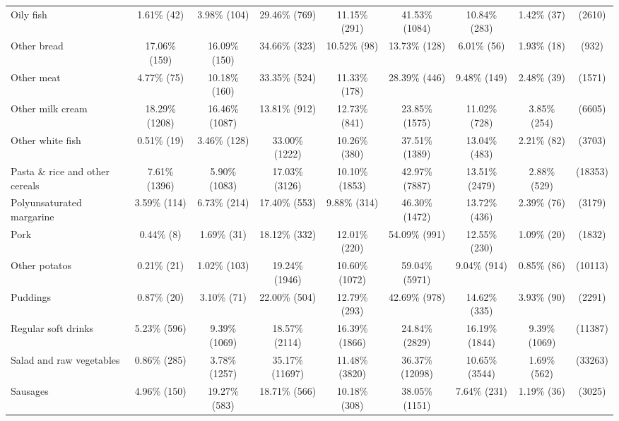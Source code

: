 \documentclass[utf8]{frontiers_suppmat} %
\begin{document}
\begin{table}[]
{\begin{tabular}{@{}lcccccccc@{}}
Oily fish                 & 1.61\%     (42)  & 3.98\%    (104)  & 29.46\%    (769) & 11.15\%   (291) & 41.53\%   (1084) & 10.84\%   (283) & 1.42\%    (37)  &    (2610) \\
Other bread               & 17.06\%    (159) & 16.09\%    (150) & 34.66\%    (323) & 10.52\%    (98) & 13.73\%    (128) & 6.01\%    (56)  & 1.93\%    (18)  &     (932) \\
Other meat                & 4.77\%     (75)  & 10.18\%    (160) & 33.35\%    (524) & 11.33\%   (178) & 28.39\%    (446) & 9.48\%   (149)  & 2.48\%    (39)  &    (1571) \\
Other milk cream          & 18.29\%   (1208) & 16.46\%   (1087) & 13.81\%    (912) & 12.73\%   (841) & 23.85\%   (1575) & 11.02\%   (728) & 3.85\%   (254)  &    (6605) \\
Other white fish          & 0.51\%     (19)  & 3.46\%    (128)  & 33.00\%   (1222) & 10.26\%   (380) & 37.51\%   (1389) & 13.04\%   (483) & 2.21\%    (82)  &    (3703) \\
Pasta \& rice and other cereals & 7.61\%   (1396)  & 5.90\%   (1083)  & 17.03\%   (3126) & 10.10\%  (1853) & 42.97\%   (7887) & 13.51\%  (2479) & 2.88\%   (529)  &   (18353) \\
Polyunsaturated margarine & 3.59\%    (114)  & 6.73\%    (214)  & 17.40\%    (553) & 9.88\%   (314)  & 46.30\%   (1472) & 13.72\%   (436) & 2.39\%    (76)  &    (3179) \\
Pork                      & 0.44\%      (8)  & 1.69\%     (31)  & 18.12\%    (332) & 12.01\%   (220) & 54.09\%    (991) & 12.55\%   (230) & 1.09\%    (20)  &    (1832) \\
Other potatos             & 0.21\%     (21)  & 1.02\%    (103)  & 19.24\%   (1946) & 10.60\%  (1072) & 59.04\%   (5971) & 9.04\%   (914)  & 0.85\%    (86)  &   (10113) \\
Puddings                  & 0.87\%     (20)  & 3.10\%     (71)  & 22.00\%    (504) & 12.79\%   (293) & 42.69\%    (978) & 14.62\%   (335) & 3.93\%    (90)  &    (2291) \\
Regular soft drinks       & 5.23\%    (596)  & 9.39\%   (1069)  & 18.57\%   (2114) & 16.39\%  (1866) & 24.84\%   (2829) & 16.19\%  (1844) & 9.39\%  (1069)  &   (11387) \\
Salad and raw vegetables  & 0.86\%    (285)  & 3.78\%   (1257)  & 35.17\%  (11697) & 11.48\%  (3820) & 36.37\%  (12098) & 10.65\%  (3544) & 1.69\%   (562)  &   (33263) \\
Sausages                  & 4.96\%    (150)  & 19.27\%    (583) & 18.71\%    (566) & 10.18\%   (308) & 38.05\%   (1151) & 7.64\%   (231)  & 1.19\%    (36)  &    (3025) \\

\end{tabular}}
\end{table}
\end{document}
